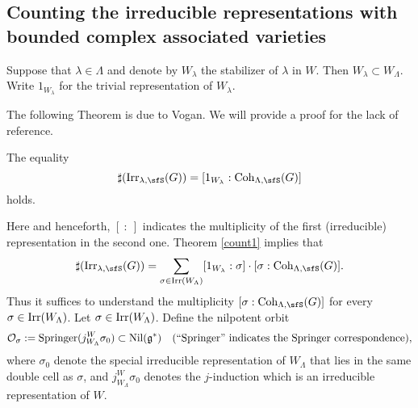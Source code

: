 \documentclass[counting_main.tex]{subfiles}
\begin{document}
\subsection{Counting the irreducible representations with bounded complex associated varieties}

Suppose that $\lambda\in \Lambda$ and denote by $W_\lambda$ the stabilizer of $\lambda$ in $W$. Then $W_\lambda\subset W_\Lambda$. Write $1_{W_\lambda}$  for the trivial representation of $W_{\lambda}$.

The following Theorem is due to Vogan. We will provide a proof for the lack of reference.
\begin{thm}\label{count1}
The equality
  \[
    \sharp(\Irr_{\lambda,\sfS}(G)) = [1_{W_{\lambda}}:\Coh_{\Lambda,\sfS}(G)]
  \]
  holds.
\end{thm}
Here and henceforth, $[\ : \ ]$ indicates the multiplicity of the first (irreducible) representation in the second one.
Theorem \ref{count1} implies that
 \begin{equation}\label{countlg}
    \sharp(\Irr_{\lambda,\sfS}(G)) = \sum_{\sigma\in \Irr(W_\Lambda)} [1_{W_{\lambda}}: \sigma]\cdot [\sigma: \Coh_{\Lambda,\sfS}(G)].
  \end{equation}
Thus it suffices to understand the multiplicity $ [\sigma: \Coh_{\Lambda,\sfS}(G)]$ for every $\sigma\in \mathrm{Irr}(W_\Lambda)$.  Let $\sigma\in  \mathrm{Irr}(W_\Lambda)$.  Define the nilpotent orbit
\[
{\mathcal {O}}_\sigma:=\mathrm{Springer}(j_{W_\Lambda}^W \sigma_0)\subset \mathrm{Nil}(\mathfrak g^*) \quad (``\mathrm{Springer}"\textrm{ indicates the Springer correspondence}),
\]
where  $\sigma_0$ denote the special irreducible representation of $W_\Lambda$ that lies in the same double cell as  $\sigma$, and $j_{W_\Lambda}^W \sigma_0$ denotes the $j$-induction which is an irreducible representation of $W$.
\end{document}
